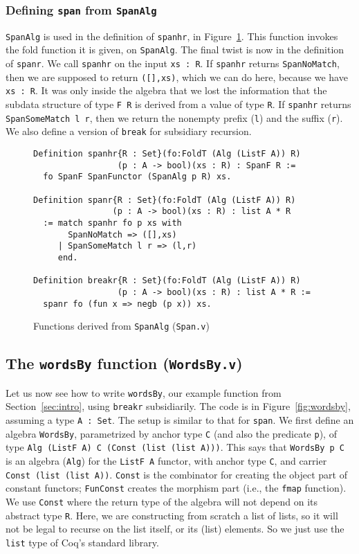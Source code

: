\documentclass[a4paper,USenglish]{lipics-v2021}
\begin{document}
\subsubsection{Defining \texttt{span} from \texttt{SpanAlg}}

\verb|SpanAlg| is used in the definition of \verb|spanhr|, in
Figure~\ref{fig:span}.  This function invokes the fold function it is
given, on \verb|SpanAlg|.  The final twist is now in the definition of
\verb|spanr|.  We call \verb|spanhr| on the input \verb|xs : R|.  If
\verb|spanhr| returns \verb|SpanNoMatch|, then we are supposed to
return \verb|([],xs)|, which we can do here, because we have
\verb|xs : R|.  It was only inside the algebra that we lost the
information that the subdata structure of type \verb|F R| is derived
from a value of type \verb|R|.  If \verb|spanhr| returns
\verb|SpanSomeMatch l r|, then we return the nonempty
prefix (\verb|l|) and the suffix (\verb|r|).  We also define a version of \verb|break| for subsidiary recursion.


\begin{figure}
\begin{verbatim}
Definition spanhr{R : Set}(fo:FoldT (Alg (ListF A)) R)
                 (p : A -> bool)(xs : R) : SpanF R :=
  fo SpanF SpanFunctor (SpanAlg p R) xs.

Definition spanr{R : Set}(fo:FoldT (Alg (ListF A)) R)
                (p : A -> bool)(xs : R) : list A * R
  := match spanhr fo p xs with
       SpanNoMatch => ([],xs)
     | SpanSomeMatch l r => (l,r)
     end.

Definition breakr{R : Set}(fo:FoldT (Alg (ListF A)) R)
                 (p : A -> bool)(xs : R) : list A * R :=
  spanr fo (fun x => negb (p x)) xs.
\end{verbatim}
\caption{Functions derived from \texttt{SpanAlg} (\texttt{Span.v})}
\label{fig:span}
\end{figure}


\subsection{The \texttt{wordsBy} function (\texttt{WordsBy.v})}

Let us now see how to write \verb|wordsBy|, our example function from
Section~\ref{sec:intro}, using \verb|breakr| subsidiarily.
The code is in Figure~\ref{fig:wordsby}, assuming a type
\verb|A : Set|.  The setup is similar to that for \verb|span|.  We first define
an algebra \verb|WordsBy|, parametrized by anchor type \verb|C| (and also
the predicate \verb|p|), of type \verb|Alg (ListF A) C (Const (list (list A)))|.
 This says that \verb|WordsBy p C| is an algebra (\verb|Alg|)
for the \verb|ListF A| functor, with anchor type \verb|C|, and carrier
\verb|Const (list (list A))|.  \verb|Const| is the combinator for
creating the object part of constant functors; \verb|FunConst| creates
the morphism part (i.e., the \verb|fmap| function).  We use 
\verb|Const| where the return type of the
algebra will not depend on its abstract type \verb|R|.  Here, we are
constructing from scratch a list of lists, so it will not be legal to
recurse on the list itself, or its (list) elements.  So we just
use the \verb|list| type of Coq's standard library.
\end{document}

